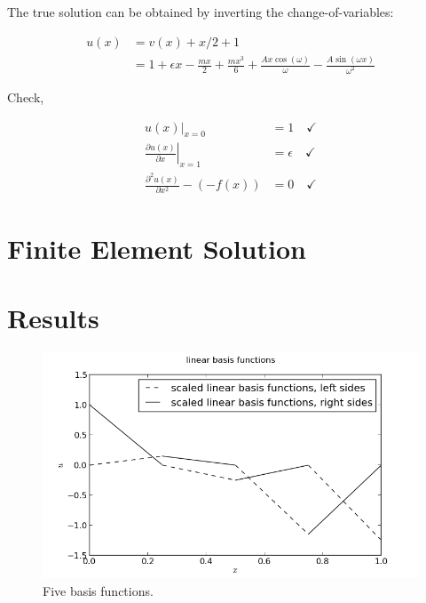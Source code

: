 \documentclass[10pt]{article}
\begin{document}
The true solution can be obtained by inverting the change-of-variables:
    
\begin{equation}
    \label{eqn:u(x)}
    \begin{split}
        u(x) &= v(x) + x/2 + 1 \\
        &= 1 + \epsilon x - \frac{m x}{2} + \frac{m x^3}{6} + \frac{A x \cos(\omega)}{\omega} -
        \frac{A \sin(\omega x)}{\omega^2}
    \end{split}
\end{equation}

Check, 

\begin{equation}
    \begin{split}
        \left. u(x) \right|_{x=0} &= 1 \quad \checkmark \\
        \left. \frac{\partial u(x)}{\partial x} \right|_{x=1} &= \epsilon \quad \checkmark \\
        \frac{\partial^2 u(x)}{\partial x^2} - (-f(x)) &= 0 \quad \checkmark
    \end{split}
\end{equation}
    

    
    
\section{Finite Element Solution}
\label{sec:FE_work}





\section{Results}
\label{sec:results}

\begin{figure}[ht]
    \centering
    \includegraphics[width=\columnwidth,keepaspectratio=true]{./hw7-basis_functions-N5.png}
    \caption{Five basis functions.}
    \label{fig:N5}
\end{figure}
\end{document}
